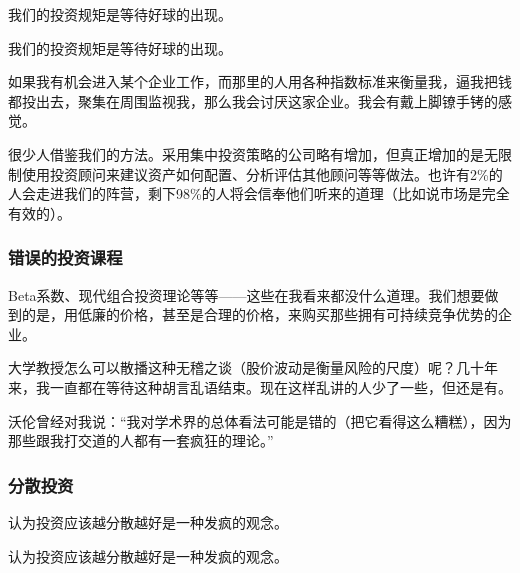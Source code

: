 我们的投资规矩是等待好球的出现。
\par

\begin{WisdomBox}
\par

我们的投资规矩是等待好球的出现。
\par
\end{WisdomBox}

如果我有机会进入某个企业工作，而那里的人用各种指数标准来衡量我，逼我把钱都投出去，聚集在周围监视我，那么我会讨厌这家企业。我会有戴上脚镣手铐的感觉。
\par

很少人借鉴我们的方法。采用集中投资策略的公司略有增加，但真正增加的是无限制使用投资顾问来建议资产如何配置、分析评估其他顾问等等做法。也许有2\%的人会走进我们的阵营，剩下98\%的人将会信奉他们听来的道理（比如说市场是完全有效的）。
\par

\subsubsection*{错误的投资课程}

Beta系数、现代组合投资理论等等——这些在我看来都没什么道理。我们想要做到的是，用低廉的价格，甚至是合理的价格，来购买那些拥有可持续竞争优势的企业。
\par

大学教授怎么可以散播这种无稽之谈（股价波动是衡量风险的尺度）呢？几十年来，我一直都在等待这种胡言乱语结束。现在这样乱讲的人少了一些，但还是有。
\par

沃伦曾经对我说：“我对学术界的总体看法可能是错的（把它看得这么糟糕），因为那些跟我打交道的人都有一套疯狂的理论。”
\par

\subsubsection*{分散投资}

认为投资应该越分散越好是一种发疯的观念。
\par

\begin{WisdomBox}
\par

认为投资应该越分散越好是一种发疯的观念。
\par
\end{WisdomBox}

